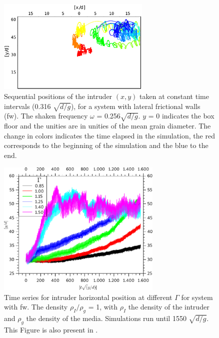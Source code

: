 \begin{figure}[H]
    \centering
    \includegraphics[width=0.65\textwidth]{04-figuras/BNE_PositionWalls.pdf}
    \caption[BNE with walls: sample of intruder positions.]{Sequential positions of the intruder $(x, y)$ taken at constant time intervals (0.316 $\sqrt{d/g}$), for a system with lateral frictional walls (fw). The shaken frequency $\omega$ = 0.256$\sqrt{d/g}$. $y$ = 0 indicates the box floor and the unities are in unities of the mean grain diameter. The change in colors indicates the time elapsed in the simulation, the red corresponds to the beginning of the simulation and the blue to the end.}
    \label{fig:BNE_intruderwalls}
\end{figure}

\begin{figure}[H]
    \centering
    \includegraphics[width=0.7\textwidth]{04-figuras/BNE25000D1.pdf}
    \caption[BNE with frictional walls: $\rho_I/\rho_g$ = 1.]{Time series for intruder horizontal position at different $\Gamma$ for system with fw. The density $\rho_I/\rho_g$ = 1, with $\rho_I$ the density of the intruder and $\rho_g$ the density of the media. Simulations run until 1550 $\sqrt{d/g}$. This Figure is also present in \cite{Large-deviation_quantification_of_boundary_conditions_on_the_Brazil_nut_effect}.}
    \label{fig:BNE25000_Parede}
\end{figure}

